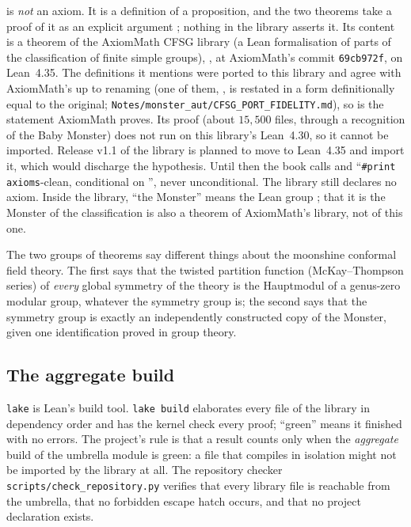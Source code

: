  is \emph{not} an axiom. It is a definition of a proposition, and the two theorems take a proof of it
as an explicit argument ; nothing in the library asserts it. Its content is a theorem of the AxiomMath CFSG
library (a Lean formalisation of parts of the classification of finite simple groups),
, at AxiomMath's commit \texttt{69cb972f}, on Lean~4.35.
The definitions it mentions were ported to this library and agree with AxiomMath's up to renaming (one of them,
, is restated in a form definitionally equal to the original; \texttt{Notes/monster\_aut/CFSG\_PORT\_FIDELITY.md}),
so  is the statement AxiomMath proves. Its proof (about $15{,}500$ files, through a recognition of the
Baby Monster) does not run on this library's Lean~4.30, so it cannot be imported. Release v1.1 of the library is planned
to move to Lean~4.35 and import it, which would discharge the hypothesis. Until then the book calls
 and  ``\texttt{\#print axioms}-clean, conditional on
'', never unconditional. The library still declares no axiom. Inside the library, ``the Monster''
means the Lean group ; that it is the Monster of the classification is also a theorem of AxiomMath's library,
not of this one.

\begin{physics}
The two groups of theorems say different things about the moonshine conformal field theory. The first says that the
twisted partition function (McKay--Thompson series) of \emph{every} global symmetry of the theory is the Hauptmodul of
a genus-zero modular group, whatever the symmetry group is; the second says that the symmetry group is exactly an
independently constructed copy of the Monster, given one identification proved in group theory.
\end{physics}

\subsection{The aggregate build}

\texttt{lake} is Lean's build tool. \texttt{lake build} elaborates every file of the library in
dependency order and has the kernel check every proof; ``green'' means it finished with no errors.
The project's rule is that a result counts only when the \emph{aggregate} build of the umbrella
module  is green: a file that compiles in isolation might not be imported by the library
at all. The repository checker \texttt{scripts/check\_repository.py} verifies that every library
file is reachable from the umbrella, that no forbidden escape hatch occurs, and that no project
 declaration exists.

